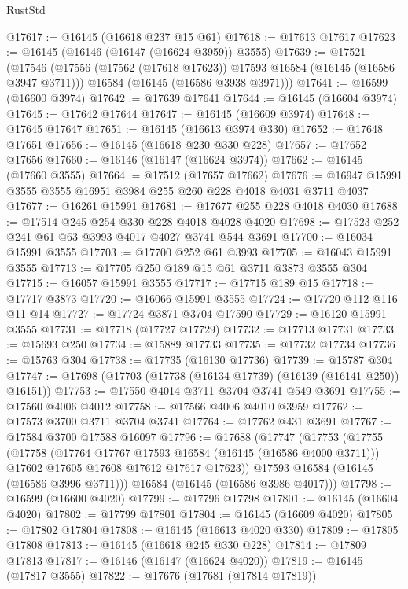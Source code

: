 \begin{lexlean}{RustStd}
\begin{coremodule}
@17617 := @16145 (@16618 @237 @15 @61)
@17618 := @17613 @17617
@17623 := @16145 (@16146 (@16147 (@16624 @3959)) @3555)
@17639 := @17521
    (@17546
      (@17556 (@17562 (@17618 @17623)) @17593 @16584 (@16145 (@16586 @3947 @3711)))
      @16584
      (@16145 (@16586 @3938 @3971)))
@17641 := @16599 (@16600 @3974)
@17642 := @17639 @17641
@17644 := @16145 (@16604 @3974)
@17645 := @17642 @17644
@17647 := @16145 (@16609 @3974)
@17648 := @17645 @17647
@17651 := @16145 (@16613 @3974 @330)
@17652 := @17648 @17651
@17656 := @16145 (@16618 @230 @330 @228)
@17657 := @17652 @17656
@17660 := @16146 (@16147 (@16624 @3974))
@17662 := @16145 (@17660 @3555)
@17664 := @17512 (@17657 @17662)
@17676 := @16947 @15991 @3555 @3555 @16951 @3984 @255 @260 @228 @4018 @4031 @3711 @4037
@17677 := @16261 @15991
@17681 := @17677 @255 @228 @4018 @4030
@17688 := @17514 @245 @254 @330 @228 @4018 @4028 @4020
@17698 := @17523 @252 @241 @61 @63 @3993 @4017 @4027 @3741 @544 @3691
@17700 := @16034 @15991 @3555
@17703 := @17700 @252 @61 @3993
@17705 := @16043 @15991 @3555
@17713 := @17705 @250 @189 @15 @61 @3711 @3873 @3555 @304
@17715 := @16057 @15991 @3555
@17717 := @17715 @189 @15
@17718 := @17717 @3873
@17720 := @16066 @15991 @3555
@17724 := @17720 @112 @116 @11 @14
@17727 := @17724 @3871 @3704 @17590
@17729 := @16120 @15991 @3555
@17731 := @17718 (@17727 @17729)
@17732 := @17713 @17731
@17733 := @15693 @250
@17734 := @15889 @17733
@17735 := @17732 @17734
@17736 := @15763 @304
@17738 := @17735 (@16130 @17736)
@17739 := @15787 @304
@17747 := @17698 (@17703 (@17738 (@16134 @17739) (@16139 (@16141 @250)) @16151))
@17753 := @17550 @4014 @3711 @3704 @3741 @549 @3691
@17755 := @17560 @4006 @4012
@17758 := @17566 @4006 @4010 @3959
@17762 := @17573 @3700 @3711 @3704 @3741
@17764 := @17762 @431 @3691
@17767 := @17584 @3700 @17588 @16097
@17796 := @17688
    (@17747
      (@17753
        (@17755
          (@17758
            (@17764 @17767 @17593 @16584 (@16145 (@16586 @4000 @3711)))
            @17602
            @17605
            @17608
            @17612
            @17617
            @17623))
        @17593
        @16584
        (@16145 (@16586 @3996 @3711)))
      @16584
      (@16145 (@16586 @3986 @4017)))
@17798 := @16599 (@16600 @4020)
@17799 := @17796 @17798
@17801 := @16145 (@16604 @4020)
@17802 := @17799 @17801
@17804 := @16145 (@16609 @4020)
@17805 := @17802 @17804
@17808 := @16145 (@16613 @4020 @330)
@17809 := @17805 @17808
@17813 := @16145 (@16618 @245 @330 @228)
@17814 := @17809 @17813
@17817 := @16146 (@16147 (@16624 @4020))
@17819 := @16145 (@17817 @3555)
@17822 := @17676 (@17681 (@17814 @17819))

\end{coremodule}
\end{lexlean}

